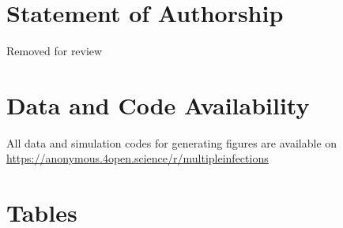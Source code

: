 \documentclass[a4paper]{scrartcl} %
\providecommand{\DIFaddbegin}{} %
\providecommand{\DIFaddend}{} %
\providecommand{\DIFdelbegin}{} %
\providecommand{\DIFdelend}{} %
\newcommand{\DIFscaledelfig}{0.5}
\newlength{\DIFdelgraphicswidth} %
\newlength{\DIFdelgraphicsheight} %
\newcommand{\DIFaddincludegraphics}[2][]{{\color{blue}\fbox{\DIFOincludegraphics[#1]{#2}}}} %
\newcommand{\DIFdelincludegraphics}[2][]{%
\sbox{\DIFdelgraphicsbox}{\DIFOincludegraphics[#1]{#2}}%
\settoboxwidth{\DIFdelgraphicswidth}{\DIFdelgraphicsbox} %
\settoboxtotalheight{\DIFdelgraphicsheight}{\DIFdelgraphicsbox} %
\scalebox{\DIFscaledelfig}{%
\parbox[b]{\DIFdelgraphicswidth}{\usebox{\DIFdelgraphicsbox}\\[-\baselineskip] \rule{\DIFdelgraphicswidth}{0em}}\llap{\resizebox{\DIFdelgraphicswidth}{\DIFdelgraphicsheight}{%
\setlength{\unitlength}{\DIFdelgraphicswidth}%
\begin{picture}(1,1)%
\thicklines\linethickness{2pt} %
{\color[rgb]{1,0,0}\put(0,0){\framebox(1,1){}}}%
{\color[rgb]{1,0,0}\put(0,0){\line( 1,1){1}}}%
{\color[rgb]{1,0,0}\put(0,1){\line(1,-1){1}}}%
\end{picture}%
}\hspace*{3pt}}} %
} %
\DeclareRobustCommand{\DIFaddbegin}{\DIFOaddbegin \let\includegraphics\DIFaddincludegraphics} %
\DeclareRobustCommand{\DIFaddend}{\DIFOaddend \let\includegraphics\DIFOincludegraphics} %
\DeclareRobustCommand{\DIFdelbegin}{\DIFOdelbegin \let\includegraphics\DIFdelincludegraphics} %
\DeclareRobustCommand{\DIFdelend}{\DIFOaddend \let\includegraphics\DIFOincludegraphics} %
\begin{document}
\section*{Statement of Authorship}
Removed for review

\section*{Data and Code Availability}
All data and simulation codes for generating figures are available on 
\url{https://anonymous.4open.science/r/multipleinfections}

\DIFdelbegin %


\DIFdelend \DIFaddbegin 
\DIFaddend 

\DIFdelbegin %

\DIFdelend \section*{Tables}
\renewcommand{\thetable}{\arabic{table}}
\setcounter{table}{0}
\end{document}
